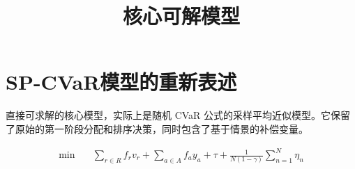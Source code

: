 \documentclass[11pt,a4paper]{article}
\title{核心可解模型}
\author{}
\date{}
\begin{document}
\maketitle

\section*{SP-CVaR模型的重新表述}
直接可求解的核心模型，实际上是随机 CVaR 公式的采样平均近似模型。它保留了原始的第一阶段分配和排序决策，同时包含了基于情景的补偿变量。

\begin{equation}
\begin{aligned}
\min \quad
& \sum_{r \in R} f_r v_r
+ \sum_{a \in A} f_a y_a
+ \tau
+ \frac{1}{N(1-\gamma)} \sum_{n=1}^N \eta_n
\end{aligned}
\tag{M1}
\end{equation}
\end{document}
